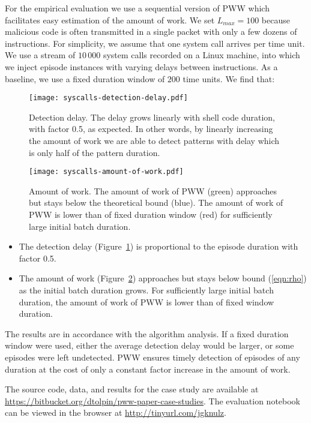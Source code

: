 \documentclass[runningheads,a4paper]{llncs}
\begin{document}
For the empirical evaluation we use a sequential version of PWW
which facilitates easy estimation of the amount of work. We set
$L_{max}=100$ because malicious code is often transmitted in a
single packet with only a few dozens of instructions. For
simplicity, we assume that  one system call arrives per time
unit. We use a stream of $10\,000$ system calls recorded on a
Linux machine, into which we inject episode instances with
varying delays between instructions. As a baseline, we use a
fixed duration window of $200$ time units. We find that:
\begin{figure}[t]
	\centering
    \texttt{[image: syscalls-detection-delay.pdf]}
	\caption{Detection delay. The delay grows linearly
    with shell code duration, with factor 0.5, as expected. In
    other words, by linearly increasing the amount of work we
    are able to detect patterns with delay which is only half of
    the pattern duration.}
    \label{fig:detection-delay}
\end{figure}
\begin{figure}[t]
	\centering
    \texttt{[image: syscalls-amount-of-work.pdf]}
    \caption{Amount of work. The amount of work of PWW (green)
    approaches but stays below the theoretical bound (blue).
    The amount of work of PWW is lower than of fixed duration window
    (red) for sufficiently large initial batch duration.}
    \label{fig:amount-of-work}
\end{figure}
\begin{itemize}
	\item The detection delay (Figure~\ref{fig:detection-delay})
		is proportional to the episode duration with factor 0.5.
	\item The amount of work (Figure~\ref{fig:amount-of-work})
        approaches but stays below bound (\ref{eqn:rho}) as the
        initial batch duration grows. For sufficiently large
        initial batch duration, the amount of work of PWW is
        lower than of fixed window duration.
\end{itemize}
The results are in accordance with the algorithm analysis.  If
a fixed duration window were used, either the average detection
delay would be larger, or some episodes were left undetected.
PWW ensures timely detection of episodes of any duration at the
cost of only a constant factor increase in the amount of work.

The source code, data, and results for the case study are available
at \url{https://bitbucket.org/dtolpin/pww-paper-case-studies}.
The evaluation notebook can be viewed in the browser at
\url{http://tinyurl.com/jgknulz}.
\end{document}

